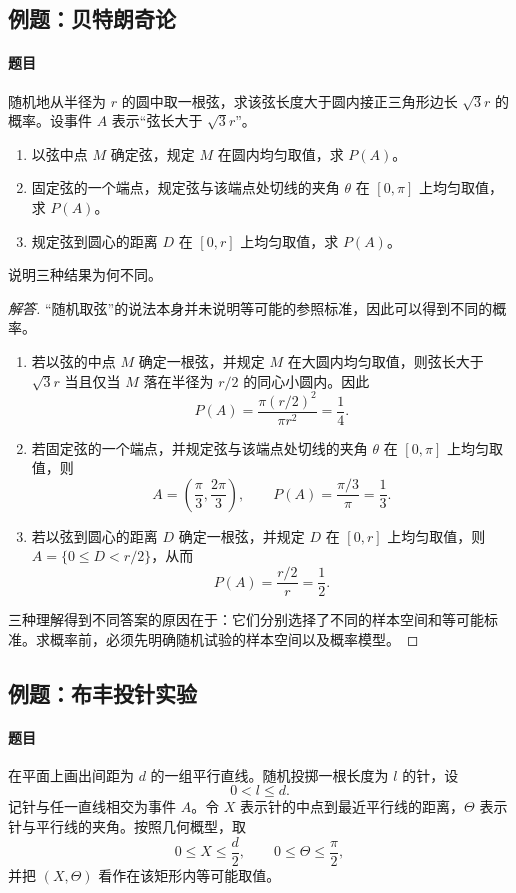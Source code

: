 \subsection{例题：贝特朗奇论}\label{note:c1:e2}
\paragraph{题目}
随机地从半径为 $r$ 的圆中取一根弦，求该弦长度大于圆内接正三角形边长 $\sqrt{3}r$ 的概率。设事件 $A$ 表示“弦长大于 $\sqrt{3}r$”。

\begin{enumerate}
\item 以弦中点 $M$ 确定弦，规定 $M$ 在圆内均匀取值，求 $P(A)$。
\item 固定弦的一个端点，规定弦与该端点处切线的夹角 $\theta$ 在 $[0,\pi]$ 上均匀取值，求 $P(A)$。
\item 规定弦到圆心的距离 $D$ 在 $[0,r]$ 上均匀取值，求 $P(A)$。
\end{enumerate}
说明三种结果为何不同。

\begin{proof}[解答]
“随机取弦”的说法本身并未说明等可能的参照标准，因此可以得到不同的概率。
\begin{enumerate}
\item 若以弦的中点 $M$ 确定一根弦，并规定 $M$ 在大圆内均匀取值，则弦长大于 $\sqrt{3}r$ 当且仅当 $M$ 落在半径为 $r/2$ 的同心小圆内。因此
\[
P(A)=\dfrac{\pi(r/2)^2}{\pi r^2}=\dfrac14.
\]

\item 若固定弦的一个端点，并规定弦与该端点处切线的夹角 $\theta$ 在 $[0,\pi]$ 上均匀取值，则
\[
A=\left(\dfrac{\pi}{3},\dfrac{2\pi}{3}\right),
\qquad
P(A)=\dfrac{\pi/3}{\pi}=\dfrac13.
\]

\item 若以弦到圆心的距离 $D$ 确定一根弦，并规定 $D$ 在 $[0,r]$ 上均匀取值，则 $A=\{0\leq D<r/2\}$，从而
\[
P(A)=\dfrac{r/2}{r}=\dfrac12.
\]
\end{enumerate}

三种理解得到不同答案的原因在于：它们分别选择了不同的样本空间和等可能标准。求概率前，必须先明确随机试验的样本空间以及概率模型。
\end{proof}

\subsection{例题：布丰投针实验}\label{note:c1:e3}
\paragraph{题目}
在平面上画出间距为 $d$ 的一组平行直线。随机投掷一根长度为 $l$ 的针，设
\[
0<l\leq d.
\]
记针与任一直线相交为事件 $A$。令 $X$ 表示针的中点到最近平行线的距离，$\Theta$ 表示针与平行线的夹角。按照几何概型，取
\[
0\leq X\leq \dfrac d2,
\qquad
0\leq \Theta\leq \dfrac{\pi}{2},
\]
并把 $(X,\Theta)$ 看作在该矩形内等可能取值。

